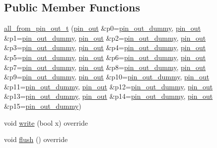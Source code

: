 \subsection*{Public Member Functions}
\begin{DoxyCompactItemize}
\item 
\hyperlink{classhwlib_1_1all__from__pin__out__t_a6d2f6ac696fe1ecf256d2f7f102cbd75}{all\+\_\+from\+\_\+pin\+\_\+out\+\_\+t} (\hyperlink{classhwlib_1_1pin__out}{pin\+\_\+out} \&p0=\hyperlink{namespacehwlib_a61238c70def9e482f316de1cba4401b7}{pin\+\_\+out\+\_\+dummy}, \hyperlink{classhwlib_1_1pin__out}{pin\+\_\+out} \&p1=\hyperlink{namespacehwlib_a61238c70def9e482f316de1cba4401b7}{pin\+\_\+out\+\_\+dummy}, \hyperlink{classhwlib_1_1pin__out}{pin\+\_\+out} \&p2=\hyperlink{namespacehwlib_a61238c70def9e482f316de1cba4401b7}{pin\+\_\+out\+\_\+dummy}, \hyperlink{classhwlib_1_1pin__out}{pin\+\_\+out} \&p3=\hyperlink{namespacehwlib_a61238c70def9e482f316de1cba4401b7}{pin\+\_\+out\+\_\+dummy}, \hyperlink{classhwlib_1_1pin__out}{pin\+\_\+out} \&p4=\hyperlink{namespacehwlib_a61238c70def9e482f316de1cba4401b7}{pin\+\_\+out\+\_\+dummy}, \hyperlink{classhwlib_1_1pin__out}{pin\+\_\+out} \&p5=\hyperlink{namespacehwlib_a61238c70def9e482f316de1cba4401b7}{pin\+\_\+out\+\_\+dummy}, \hyperlink{classhwlib_1_1pin__out}{pin\+\_\+out} \&p6=\hyperlink{namespacehwlib_a61238c70def9e482f316de1cba4401b7}{pin\+\_\+out\+\_\+dummy}, \hyperlink{classhwlib_1_1pin__out}{pin\+\_\+out} \&p7=\hyperlink{namespacehwlib_a61238c70def9e482f316de1cba4401b7}{pin\+\_\+out\+\_\+dummy}, \hyperlink{classhwlib_1_1pin__out}{pin\+\_\+out} \&p8=\hyperlink{namespacehwlib_a61238c70def9e482f316de1cba4401b7}{pin\+\_\+out\+\_\+dummy}, \hyperlink{classhwlib_1_1pin__out}{pin\+\_\+out} \&p9=\hyperlink{namespacehwlib_a61238c70def9e482f316de1cba4401b7}{pin\+\_\+out\+\_\+dummy}, \hyperlink{classhwlib_1_1pin__out}{pin\+\_\+out} \&p10=\hyperlink{namespacehwlib_a61238c70def9e482f316de1cba4401b7}{pin\+\_\+out\+\_\+dummy}, \hyperlink{classhwlib_1_1pin__out}{pin\+\_\+out} \&p11=\hyperlink{namespacehwlib_a61238c70def9e482f316de1cba4401b7}{pin\+\_\+out\+\_\+dummy}, \hyperlink{classhwlib_1_1pin__out}{pin\+\_\+out} \&p12=\hyperlink{namespacehwlib_a61238c70def9e482f316de1cba4401b7}{pin\+\_\+out\+\_\+dummy}, \hyperlink{classhwlib_1_1pin__out}{pin\+\_\+out} \&p13=\hyperlink{namespacehwlib_a61238c70def9e482f316de1cba4401b7}{pin\+\_\+out\+\_\+dummy}, \hyperlink{classhwlib_1_1pin__out}{pin\+\_\+out} \&p14=\hyperlink{namespacehwlib_a61238c70def9e482f316de1cba4401b7}{pin\+\_\+out\+\_\+dummy}, \hyperlink{classhwlib_1_1pin__out}{pin\+\_\+out} \&p15=\hyperlink{namespacehwlib_a61238c70def9e482f316de1cba4401b7}{pin\+\_\+out\+\_\+dummy})
\item 
void \hyperlink{classhwlib_1_1all__from__pin__out__t_aa718f395267d22934d63c1d90ff83896}{write} (bool x) override
\item 
void \hyperlink{classhwlib_1_1all__from__pin__out__t_ad051258aabc84d5bc50bba6addb8d12c}{flush} () override
\end{DoxyCompactItemize}


